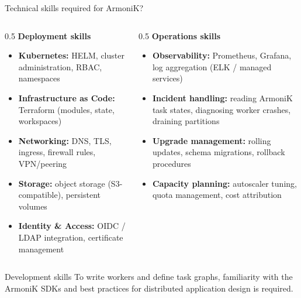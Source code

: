 \begin{frame}{Technical skills required for ArmoniK?}
	\begin{columns}[T]
		\begin{column}{0.5\textwidth}
			\textbf{Deployment skills}
			\begin{itemize}
				\item \textbf{Kubernetes:} HELM, cluster administration, RBAC, namespaces
				\item \textbf{Infrastructure as Code:} Terraform (modules, state, workspaces)
				\item \textbf{Networking:} DNS, TLS, ingress, firewall rules, VPN/peering
				\item \textbf{Storage:} object storage (S3-compatible), persistent volumes
				\item \textbf{Identity \& Access:} OIDC / LDAP integration, certificate management
			\end{itemize}
		\end{column}
		\begin{column}{0.5\textwidth}
			\textbf{Operations skills}
			\begin{itemize}
				\item \textbf{Observability:} Prometheus, Grafana, log aggregation (ELK / managed services)
				\item \textbf{Incident handling:} reading ArmoniK task states, diagnosing worker crashes, draining partitions
				\item \textbf{Upgrade management:} rolling updates, schema migrations, rollback procedures
				\item \textbf{Capacity planning:} autoscaler tuning, quota management, cost attribution
			\end{itemize}
		\end{column}
	\end{columns}
	\vspace{0.2cm}
	\begin{alertblock}{Development skills}
		To write workers and define task graphs, familiarity with the ArmoniK SDKs and best practices for distributed application design is required.
	\end{alertblock}
\end{frame}
